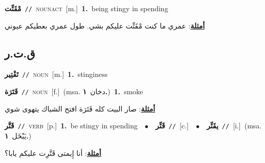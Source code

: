 \documentclass[10pt,a4paper,twoside]{article} %
\begin{document}
\begin{multicols}{2}
{\setlength\topsep{0pt}\textbf{\foreignlanguage{arabic}{مْقَتِّت}}\ {\color{gray}\texttt{//}\color{black}}\ \textsc{noun\textunderscore act}\ [m.]\ \textbf{1.}~being stingy in spending\  \begin{flushright}\color{gray}\foreignlanguage{arabic}{\textbf{\underline{\foreignlanguage{arabic}{أمثلة}}}: عمري ما كنت مْقَتِّت عليكم بشي. طول عمري بعطيكم عيوني}\end{flushright}\color{black}} \vspace{2mm}

\vspace{-3mm}
\subsection*{\color{blue}\foreignlanguage{arabic}{ق.ت.ر}\color{blue}{}} 

{\setlength\topsep{0pt}\textbf{\foreignlanguage{arabic}{تَقْتِير}}\ {\color{gray}\texttt{//}\color{black}}\ \textsc{noun}\ [m.]\ \textbf{1.}~stinginess\ } \vspace{2mm}

{\setlength\topsep{0pt}\textbf{\foreignlanguage{arabic}{قَتَرَة}}\ {\color{gray}\texttt{//}\color{black}}\ \textsc{noun}\ [f.]\ \color{gray}(msa. \foreignlanguage{arabic}{دخان}~\foreignlanguage{arabic}{\textbf{١.}})\color{black}\ \textbf{1.}~smoke\  \begin{flushright}\color{gray}\foreignlanguage{arabic}{\textbf{\underline{\foreignlanguage{arabic}{أمثلة}}}: صار البيت كله قَتَرَة افتح الشباك يتهوى شوي}\end{flushright}\color{black}} \vspace{2mm}

{\setlength\topsep{0pt}\textbf{\foreignlanguage{arabic}{قَتَّر}}\ {\color{gray}\texttt{//}\color{black}}\ \textsc{verb}\ [p.]\ \textbf{1.}~be stingy in spending\ \ $\bullet$\ \ \setlength\topsep{0pt}\textbf{\foreignlanguage{arabic}{قَتِّر}}\ {\color{gray}\texttt{//}\color{black}}\ [c.]\ \ $\bullet$\ \ \setlength\topsep{0pt}\textbf{\foreignlanguage{arabic}{يقَتِّر}}\ {\color{gray}\texttt{//}\color{black}}\ [i.]\ \color{gray}(msa. \foreignlanguage{arabic}{يَبْخَل}~\foreignlanguage{arabic}{\textbf{١.}})\color{black}\  \begin{flushright}\color{gray}\foreignlanguage{arabic}{\textbf{\underline{\foreignlanguage{arabic}{أمثلة}}}: أنا إِيمتى قَتَّرِت عليكم يابا؟}\end{flushright}\color{black}} \vspace{2mm}


\end{multicols}
\end{document}
